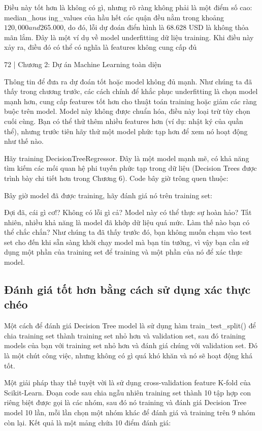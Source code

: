 Điều này tốt hơn là không có gì, nhưng rõ ràng không phải là một điểm số cao: median\_hous ing\_values của hầu hết các quận đều nằm trong khoảng $120,000 and $265.000, do đó, lỗi dự đoán điển hình là 68.628 USD là không thỏa mãn lắm. Đây là một ví dụ về model underfitting dữ liệu training. Khi điều này xảy ra, điều đó có thể có nghĩa là features không cung cấp đủ

72 | Chương 2: Dự án Machine Learning toàn diện

Thông tin để đưa ra dự đoán tốt hoặc model không đủ mạnh. Như chúng ta đã thấy trong chương trước, các cách chính để khắc phục underfitting là chọn model mạnh hơn, cung cấp features tốt hơn cho thuật toán training hoặc giảm các ràng buộc trên model. Model này không được chuẩn hóa, điều này loại trừ tùy chọn cuối cùng. Bạn có thể thử thêm nhiều features hơn (ví dụ: nhật ký của quần thể), nhưng trước tiên hãy thử một model phức tạp hơn để xem nó hoạt động như thế nào.

Hãy training DecisionTreeRegressor. Đây là một model mạnh mẽ, có khả năng tìm kiếm các mối quan hệ phi tuyến phức tạp trong dữ liệu (Decision Trees được trình bày chi tiết hơn trong Chương 6). Code bây giờ trông quen thuộc:

Bây giờ model đã được training, hãy đánh giá nó trên training set:

Đợi đã, cái gì cơ!? Không có lỗi gì cả? Model này có thể thực sự hoàn hảo? Tất nhiên, nhiều khả năng là model đã khớp dữ liệu quá mức. Làm thế nào bạn có thể chắc chắn? Như chúng ta đã thấy trước đó, bạn không muốn chạm vào test set cho đến khi sẵn sàng khởi chạy model mà bạn tin tưởng, vì vậy bạn cần sử dụng một phần của training set để training và một phần của nó để xác thực model.

\subsection{Đánh giá tốt hơn bằng cách sử dụng xác thực chéo}

Một cách để đánh giá Decision Tree model là sử dụng hàm train\_test\_split() để chia training set thành training set nhỏ hơn và validation set, sau đó training models của bạn với training set nhỏ hơn và đánh giá chúng với validation set. Đó là một chút công việc, nhưng không có gì quá khó khăn và nó sẽ hoạt động khá tốt.

Một giải pháp thay thế tuyệt vời là sử dụng cross-validation feature K-fold của Scikit-Learn. Đoạn code sau chia ngẫu nhiên training set thành 10 tập hợp con riêng biệt được gọi là các nhóm, sau đó nó training và đánh giá Decision Tree model 10 lần, mỗi lần chọn một nhóm khác để đánh giá và training trên 9 nhóm còn lại. Kết quả là một mảng chứa 10 điểm đánh giá:

